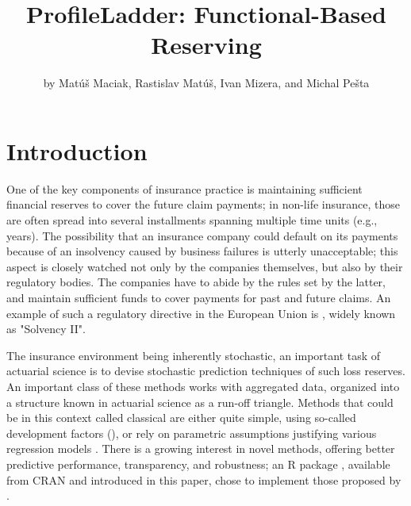 \title{ProfileLadder: Functional-Based Reserving}
\author{by Matúš Maciak, Rastislav Matúš, Ivan Mizera, and Michal Pešta}

\maketitle


\section{Introduction}\label{intro}
One of the key components of insurance practice is maintaining sufficient financial reserves to cover the future claim payments; in non-life insurance, those are often spread into several installments spanning multiple time units (e.g., years). The possibility that an insurance company could default on its payments because of an insolvency caused by business failures is utterly unacceptable; this aspect is closely watched not only by the companies themselves, but also by their regulatory bodies. The companies have to abide by the rules set by the latter, and maintain sufficient funds to cover payments for past and future claims. An example of such a regulatory directive in the European Union is \citet{solvency2}, widely known as "Solvency II".

The insurance environment being inherently stochastic, an important task of actuarial science is to devise stochastic prediction techniques of such loss reserves. An important class of these methods works with aggregated data, organized into a structure known in actuarial science as a run-off triangle. Methods that could be in this context called classical are either quite simple, using so-called development factors (\citealp{Mack1993, Renshaw1998, Clark2003, VD2011}), or rely on parametric assumptions justifying various regression models \citep{Verrall1996, MPO2021}. There is a growing interest in novel methods, offering better predictive performance, transparency, and robustness; 
an R package , available from CRAN and introduced in this paper, chose to implement those proposed by \cite{MMP2022}. 

